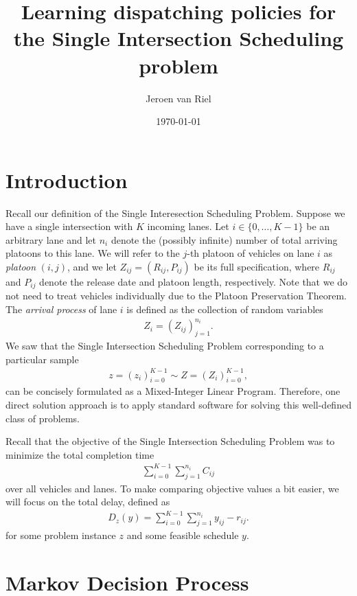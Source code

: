 \documentclass{article}
\title{Learning dispatching policies for the Single Intersection Scheduling problem}
\author{Jeroen van Riel}
\date{\monthyeardate\today}
\theoremstyle{definition}
\theoremstyle{plain}
\begin{document}
\maketitle

\section{Introduction}

Recall our definition of the Single Interesection Scheduling Problem. Suppose we
have a single intersection with $K$ incoming lanes. Let
$i \in \{0, \dots, K - 1\}$ be an arbitrary lane and let $n_{i}$ denote the
(possibly infinite) number of total arriving platoons to this lane. We will
refer to the $j$-th platoon of vehicles on lane $i$ as \textit{platoon}
$(i, j)$, and we let $Z_{ij} = (R_{ij}, P_{ij})$ be its full specification,
where $R_{ij}$ and $P_{ij}$ denote the release date and platoon length,
respectively. Note that we do not need to treat vehicles individually due to the
Platoon Preservation Theorem.
The \textit{arrival process} of lane $i$ is defined as the collection of random variables
\begin{align}
  Z_{i} = { (Z_{ij}) }_{j=1}^{n_{i}} .
\end{align}
We saw that the Single Intersection Scheduling Problem corresponding to a
particular sample
\begin{align}
  z = {( z_{i} )}_{i=0}^{K-1} \sim Z = {( Z_{i} )}_{i=0}^{K-1} ,
\end{align}
can be concisely formulated as a Mixed-Integer Linear Program. Therefore, one
direct solution approach is to apply standard software for solving this
well-defined class of problems.

Recall that the objective of the Single Intersection Scheduling Problem was to minimize the total completion time
\begin{align}
  \sum_{i=0}^{K-1} \sum_{j=1}^{n_{i}} C_{ij}
\end{align}
over all vehicles and lanes.
%
To make comparing objective values a bit easier, we will focus on the total delay, defined as
\begin{align}
  D_{z}(y) = \sum_{i=0}^{K-1} \sum_{j=1}^{n_{i}} y_{ij} - r_{ij} .
\end{align}
for some problem instance $z$ and some feasible schedule $y$.


\section{Markov Decision Process}
\end{document}
